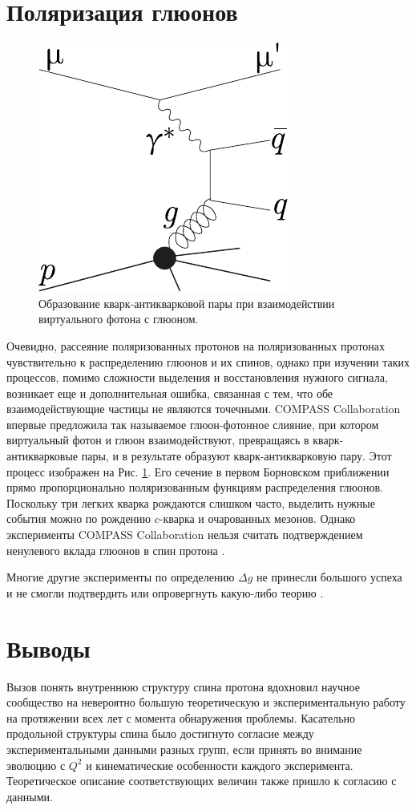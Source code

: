 \documentclass[
	a4paper, 10pt,
	twocolumn
]{article}
\begin{document}
\section{Поляризация глюонов}
\begin{figure}
\includegraphics[width=.6\linewidth]{figs/Gluon-g1}
\caption{Образование кварк-антикварковой пары при взаимодействии виртуального фотона с глюоном.}
\label{fig:gluon}
\end{figure}

Очевидно, рассеяние поляризованных протонов на поляризованных протонах чувствительно к распределению глюонов и их спинов, однако при изучении таких процессов, помимо сложности выделения и восстановления нужного сигнала, возникает еще и дополнительная ошибка, связанная с тем, что обе взаимодействующие частицы не являются точечными. 
COMPASS Collaboration впервые предложила так называемое глюон-фотонное слияние, при котором виртуальный фотон и глюон взаимодействуют, превращаясь в кварк-антикварковые пары, и в результате образуют кварк-антикварковую пару. Этот процесс изображен на Рис. \ref{fig:gluon}.
Его сечение в первом Борновском приближении прямо пропорционально поляризованным функциям распределения глюонов. Поскольку три легких кварка рождаются слишком часто, выделить нужные события можно по рождению $c$-кварка и очарованных мезонов. 
Однако эксперименты COMPASS Collaboration нельзя считать подтверждением ненулевого вклада глюонов в спин протона \cite{COMPASS.gluon1, COMPASS.gluon2}. 

Многие другие эксперименты по определению $\Delta g$ не принесли большого успеха и не смогли подтвердить или опровергнуть какую-либо теорию \cite{HERMES.gluon,STAR.gluon,PHENIX.gluon}.


\section{Выводы}
Вызов понять внутреннюю структуру спина протона вдохновил научное сообщество на невероятно большую теоретическую и экспериментальную работу на протяжении всех лет с момента обнаружения проблемы. Касательно продольной структуры спина было достигнуто согласие между экспериментальными данными разных групп, если принять во внимание эволюцию с $Q^2$ и кинематические особенности каждого эксперимента. Теоретическое описание соответствующих величин также пришло к согласию с данными.
\end{document}

